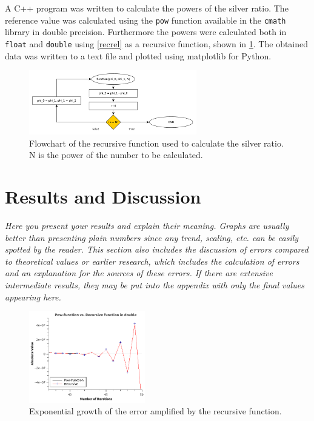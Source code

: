 \documentclass[letterpaper,12pt]{article}
\begin{document}
		A C++ program was written to calculate the powers of the silver ratio. The reference value was calculated using the \texttt{pow} function available in the \texttt{cmath} library in double precision. Furthermore the powers were calculated both in \texttt{float} and \texttt{double} using \cref{recrel} as a recursive function, shown in \cref{fig:function}. The obtained data was written to a text file and plotted using matplotlib for Python.
		
	\begin{figure}[h]
		\centering
		\includegraphics[width=0.65\textwidth]{flowchart.pdf}
		\caption{Flowchart of the recursive function used to calculate the silver ratio. N is the power of the number to be calculated.}
		\label{fig:function}
	\end{figure}
	
	
	\section{Results and Discussion}
		\textit{Here you present your results and explain their meaning. Graphs are usually better than presenting plain numbers since any trend, scaling, etc. can be easily spotted by the reader.
			This section also includes the discussion of errors compared to theoretical values or earlier research, which includes the calculation of errors and an explanation for the sources of these errors. If there are extensive intermediate results, they may be put into the appendix with only the final values appearing here.}
	
	\begin{figure}[h]
		\centering
		\includegraphics[width=0.45\textwidth]{powvsdouble.png}
		\caption{Exponential growth of the error amplified by the recursive function.}
		\label{fig:powvsrec}
	\end{figure}
	
\end{document}
